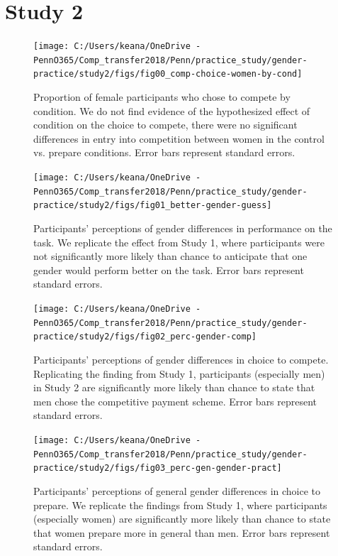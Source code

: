 \documentclass[a4paper, nobind]{templates/ociamthesis}
\begin{document}
\hypertarget{study-2-1}{%
\section{Study 2}\label{study-2-1}}

\begin{figure}
\texttt{[image: C:/Users/keana/OneDrive - PennO365/Comp\_transfer2018/Penn/practice\_study/gender-practice/study2/figs/fig00\_comp-choice-women-by-cond]} \caption{Proportion of female participants who chose to compete by condition. We do not find evidence of the hypothesized effect of condition on the choice to compete, there were no significant differences in entry into competition between women in the control vs. prepare conditions. Error bars represent standard errors.}\label{fig:s200}
\end{figure}

\begin{figure}
\texttt{[image: C:/Users/keana/OneDrive - PennO365/Comp\_transfer2018/Penn/practice\_study/gender-practice/study2/figs/fig01\_better-gender-guess]} \caption{Participants' perceptions of gender differences in performance on the task. We replicate the effect from Study 1, where participants were not significantly more likely than chance to anticipate that one gender would perform better on the task. Error bars represent standard errors.}\label{fig:s201}
\end{figure}

\begin{figure}
\texttt{[image: C:/Users/keana/OneDrive - PennO365/Comp\_transfer2018/Penn/practice\_study/gender-practice/study2/figs/fig02\_perc-gender-comp]} \caption{Participants' perceptions of gender differences in choice to compete. Replicating the finding from Study 1, participants (especially men) in Study 2 are significantly more likely than chance to state that men chose the competitive payment scheme. Error bars represent standard errors.}\label{fig:s202}
\end{figure}

\begin{figure}
\texttt{[image: C:/Users/keana/OneDrive - PennO365/Comp\_transfer2018/Penn/practice\_study/gender-practice/study2/figs/fig03\_perc-gen-gender-pract]} \caption{Participants' perceptions of general gender differences in choice to prepare. We replicate the findings from Study 1, where participants (especially women) are significantly more likely than chance to state that women prepare more in general than men. Error bars represent standard errors.}\label{fig:s203}
\end{figure}
\end{document}
